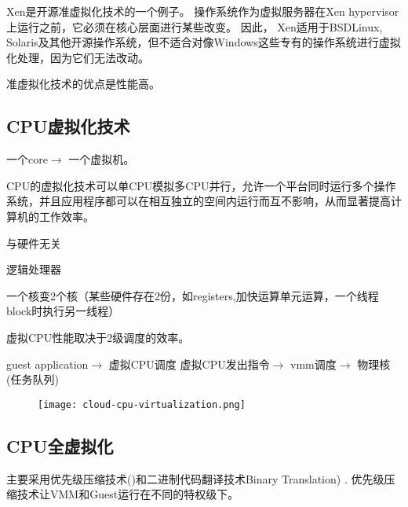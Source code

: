 Xen是开源准虚拟化技术的一个例子。 操作系统作为虚拟服务器在Xen hypervisor上运行之前，它必须在核心层面进行某些改变。 因此， Xen适用于BSDLinux, Solaris及其他开源操作系统，但不适合对像Windows这些专有的操作系统进行虚拟化处理，因为它们无法改动。 

准虚拟化技术的优点是性能高。 


\subsection{CPU虚拟化技术}


\begin{definition}[CPU虚拟化技术]
    一个core$\rightarrow$ 一个虚拟机。
\end{definition}

CPU的虚拟化技术可以单CPU模拟多CPU并行，允许一个平台同时运行多个操作系统，并且应用程序都可以在相互独立的空间内运行而互不影响，从而显著提高计算机的工作效率。 

\begin{definition}
    与硬件无关
\end{definition}

\begin{definition}
    逻辑处理器
\end{definition}

\begin{definition}[hyperthread]
    一个核变2个核（某些硬件存在2份，如registers,加快运算单元运算，一个线程block时执行另一线程）
\end{definition}

\begin{remark}
    虚拟CPU性能取决于2级调度的效率。

    guest application$\rightarrow$ 虚拟CPU调度
    虚拟CPU发出指令$\rightarrow$ vmm调度$\rightarrow$ 物理核(任务队列)

    \begin{figure}[htbp]
        \begin{center}
            \texttt{[image: cloud-cpu-virtualization.png]}
        \end{center}
    \end{figure}
\end{remark}



\subsection{CPU全虚拟化}
主要采用优先级压缩技术()和二进制代码翻译技术Binary Translation) . 优先级压缩技术让VMM和Guest运行在不同的特权级下。 

